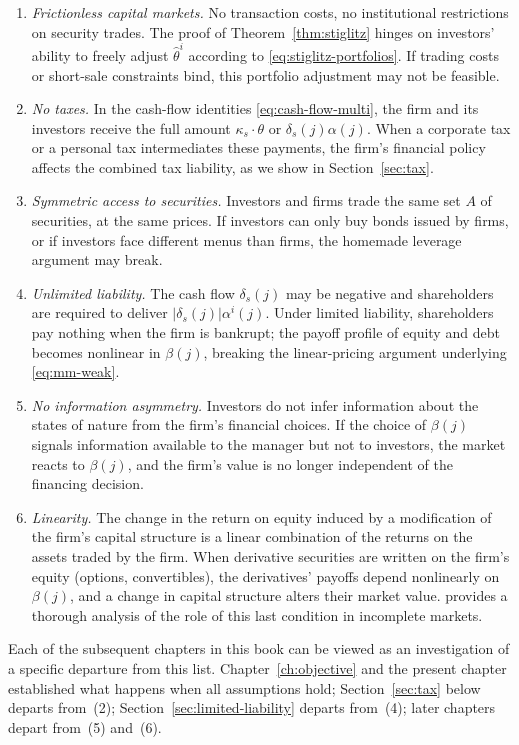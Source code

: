 \documentclass[11pt,a4paper,oneside]{book}
\theoremstyle{plain}
\theoremstyle{definition}
\theoremstyle{remark}
\numberwithin{equation}{chapter}
\begin{document}
\begin{enumerate}
  \item \emph{Frictionless capital markets.}
  No transaction costs, no institutional restrictions on security trades.
  The proof of Theorem~\ref{thm:stiglitz} hinges on investors' ability to freely adjust $\widehat{\theta}^i$ according to \eqref{eq:stiglitz-portfolios}.
  If trading costs or short-sale constraints bind, this portfolio adjustment may not be feasible.

  \item \emph{No taxes.}
  In the cash-flow identities \eqref{eq:cash-flow-multi}, the firm and its investors receive the full amount $\kappa_s \cdot \theta$ or $\delta_s(j) \alpha(j)$.
  When a corporate tax or a personal tax intermediates these payments, the firm's financial policy affects the combined tax liability, as we show in Section~\ref{sec:tax}.

  \item \emph{Symmetric access to securities.}
  Investors and firms trade the same set $A$ of securities, at the same prices.
  If investors can only buy bonds issued by firms, or if investors face different menus than firms, the homemade leverage argument may break.

  \item \emph{Unlimited liability.}
  The cash flow $\delta_s(j)$ may be negative and shareholders are required to deliver $|\delta_s(j)| \alpha^i(j)$.
  Under limited liability, shareholders pay nothing when the firm is bankrupt; the payoff profile of equity and debt becomes nonlinear in $\beta(j)$, breaking the linear-pricing argument underlying \eqref{eq:mm-weak}.

  \item \emph{No information asymmetry.}
  Investors do not infer information about the states of nature from the firm's financial choices.
  If the choice of $\beta(j)$ signals information available to the manager but not to investors, the market reacts to $\beta(j)$, and the firm's value is no longer independent of the financing decision.

  \item \emph{Linearity.}
  The change in the return on equity induced by a modification of the firm's capital structure is a linear combination of the returns on the assets traded by the firm.
  When derivative securities are written on the firm's equity (options, convertibles), the derivatives' payoffs depend nonlinearly on $\beta(j)$, and a change in capital structure alters their market value.
  \citet{Gottardi1995} provides a thorough analysis of the role of this last condition in incomplete markets.
\end{enumerate}
Each of the subsequent chapters in this book can be viewed as an investigation of a specific departure from this list.
Chapter~\ref{ch:objective} and the present chapter established what happens when all assumptions hold; Section~\ref{sec:tax} below departs from~(2); Section~\ref{sec:limited-liability} departs from~(4); later chapters depart from~(5) and~(6).
\end{document}

